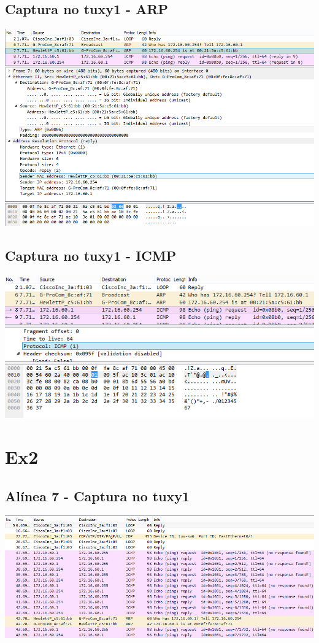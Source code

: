 \documentclass[11pt,a4paper,reqno]{report}
\numberwithin{equation}{section}
\begin{document}
\begin{appendices}
\subsection{Captura no tuxy1 - ARP}
\includegraphics[width=18cm]{ex1_arp.png}
\subsection{Captura no tuxy1 - ICMP}
\includegraphics[width=18cm]{ex1_icmp.png}

\section{Ex2}%
\label{ex_2}
\subsection{Alínea 7 - Captura no tuxy1}
\includegraphics[width=18cm]{ex2_a7_tux1.png}

\end{appendices}
\end{document}
